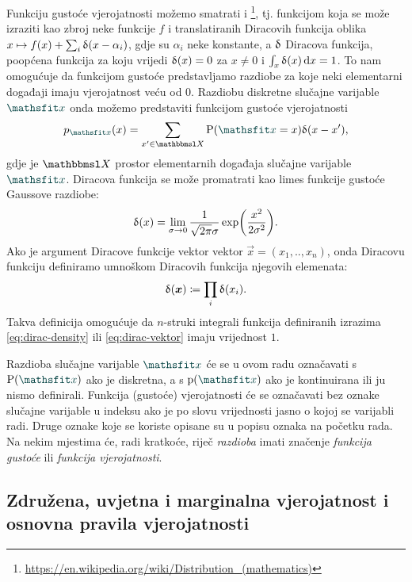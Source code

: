 \documentclass[utf8, diplomski, lmodern]{fer}
\begin{document}
Funkciju gustoće vjerojatnosti možemo smatrati i \footnote{\url{https://en.wikipedia.org/wiki/Distribution_(mathematics)}}, tj. funkcijom koja se može izraziti kao zbroj neke funkcije $f$ i translatiranih Diracovih funkcija oblika $x\mapsto f(x)+\sum_i\updelta(x-\alpha_i)$, gdje su $\alpha_i$ neke konstante, a $\updelta$ Diracova funkcija, poopćena funkcija za koju vrijedi $\updelta(x)=0$ za $x\neq0$ i $\int_x\updelta(x)\mathop{}\!\mathrm{d} x=1$. To nam omogućuje da funkcijom gustoće predstavljamo razdiobe za koje neki elementarni događaji imaju vjerojatnost veću od $0$. Razdiobu diskretne slučajne varijable $\rvar x$ onda možemo predstaviti funkcijom gustoće vjerojatnosti 
\begin{align} \label{eq:dirac-density}
p_{\rvar x}(x)=\sum_{x'\in\set X} \P(\rvar x=x) \dirac(x-x')  \text{,}
\end{align}
gdje je $\set X$ prostor elementarnih događaja slučajne varijable $\rvar x$. Diracova funkcija se može promatrati kao limes funkcije gustoće Gaussove razdiobe:
\begin{align*}
\dirac(x)=\lim_{\sigma\to 0}\frac{1}{\sqrt{2\pi}\sigma}\exp\del{\frac{x^2}{2\sigma^2}}.
\end{align*}
Ako je argument Diracove funkcije vektor vektor $\vec x=(x_1,..,x_n)$, onda Diracovu funkciju definiramo umnoškom Diracovih funkcija njegovih elemenata:
\begin{align} \label{eq:dirac-vektor}
\dirac(\vec x)\coloneqq\prod_i\dirac(x_i) \text{.}
\end{align}
Takva definicija omogućuje da $n$-struki integrali funkcija definiranih izrazima \eqref{eq:dirac-density} ili \eqref{eq:dirac-vektor} imaju vrijednost $1$.


Razdioba slučajne varijable $\rvar x$ će se u ovom radu označavati s $\P(\rvar x)$ ako je diskretna, a s $\p(\rvar x)$ ako je kontinuirana ili ju nismo definirali. Funkcija (gustoće) vjerojatnosti će se označavati bez oznake slučajne varijable u indeksu ako je po slovu vrijednosti jasno o kojoj se varijabli radi. Druge oznake koje se koriste opisane su u popisu oznaka na početku rada. Na nekim mjestima će, radi kratkoće, riječ \textit{razdioba} imati značenje \textit{funkcija gustoće} ili \textit{funkcija vjerojatnosti}.

\subsection{Združena, uvjetna i marginalna vjerojatnost i osnovna pravila vjerojatnosti}
\end{document}
